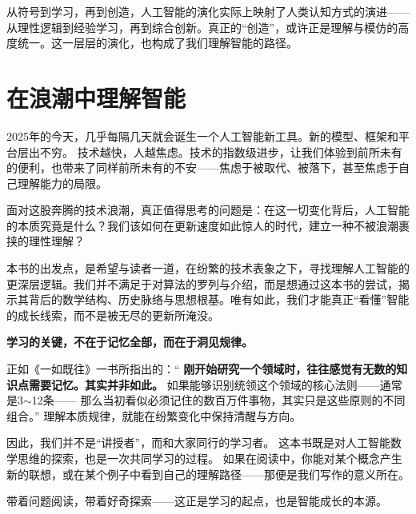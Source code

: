 从符号到学习，再到创造，人工智能的演化实际上映射了人类认知方式的演进——从理性逻辑到经验学习，再到综合创新。真正的“创造”，或许正是理解与模仿的高度统一。这一层层的演化，也构成了我们理解智能的路径。

\section{在浪潮中理解智能}
2025年的今天，几乎每隔几天就会诞生一个人工智能新工具。新的模型、框架和平台层出不穷。
技术越快，人越焦虑。技术的指数级进步，让我们体验到前所未有的便利，也带来了同样前所未有的不安——焦虑于被取代、被落下，甚至焦虑于自己理解能力的局限。  

面对这股奔腾的技术浪潮，真正值得思考的问题是：在这一切变化背后，人工智能的本质究竟是什么？我们该如何在更新速度如此惊人的时代，建立一种不被浪潮裹挟的理性理解？  

本书的出发点，是希望与读者一道，在纷繁的技术表象之下，寻找理解人工智能的更深层逻辑。我们并不满足于对算法的罗列与介绍，而是想通过这本书的尝试，揭示其背后的数学结构、历史脉络与思想根基。唯有如此，我们才能真正“看懂”智能的成长线索，而不是被无尽的更新所淹没。  

{\bf 学习的关键，不在于记忆全部，而在于洞见规律。}

正如《一如既往》一书所指出的：“
{\bf 刚开始研究一个领域时，往往感觉有无数的知识点需要记忆。其实并非如此。}
如果能够识别统领这个领域的核心法则——通常是3$\sim$12条——
那么当初看似必须记住的数百万件事物，其实只是这些原则的不同组合。”
理解本质规律，就能在纷繁变化中保持清醒与方向。  

因此，我们并不是“讲授者”，而和大家同行的学习者。  
这本书既是对人工智能数学思维的探索，也是一次共同学习的过程。  
如果在阅读中，你能对某个概念产生新的联想，或在某个例子中看到自己的理解路径——那便是我们写作的意义所在。  


带着问题阅读，带着好奇探索——这正是学习的起点，也是智能成长的本源。

\newpage
